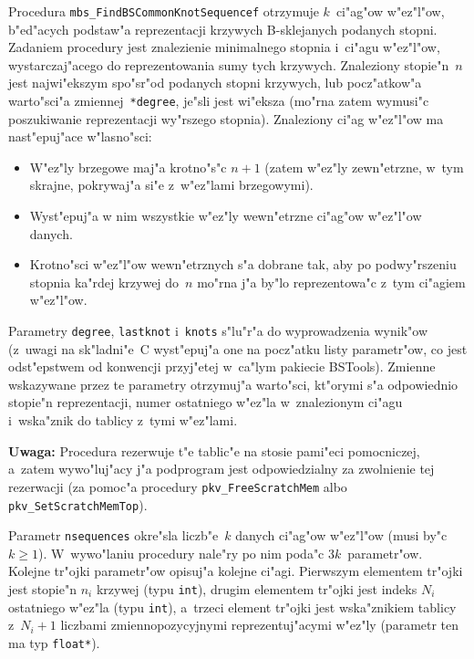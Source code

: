 \vspace{\bigskipamount}
Procedura \texttt{mbs\_FindBSCommonKnotSequencef} otrzymuje $k$~ci"ag"ow
w"ez"l"ow, b"ed"acych podstaw"a reprezentacji krzywych B-sklejanych
podanych stopni. Zadaniem procedury jest znalezienie minimalnego
stopnia i~ci"agu w"ez"l"ow, wystarczaj"acego do reprezentowania sumy
tych krzywych. Znaleziony stopie"n~$n$ jest najwi"ekszym spo"sr"od
podanych stopni krzywych, lub pocz"atkow"a warto"sci"a
zmiennej~\texttt{*degree}, je"sli jest wi"eksza (mo"rna zatem wymusi"c
poszukiwanie reprezentacji wy"rszego stopnia). Znaleziony ci"ag w"ez"l"ow
ma nast"epuj"ace w"lasno"sci:
\begin{itemize}
\item W"ez"ly brzegowe maj"a krotno"s"c $n+1$ (zatem w"ez"ly zewn"etrzne,
  w~tym skrajne, pokrywaj"a si"e z~w"ez"lami brzegowymi).
\item Wyst"epuj"a w nim wszystkie w"ez"ly wewn"etrzne ci"ag"ow w"ez"l"ow
  danych.
\item Krotno"sci w"ez"l"ow wewn"etrznych s"a dobrane tak, aby po
  podwy"rszeniu stopnia ka"rdej krzywej do~$n$ mo"rna j"a by"lo
  reprezentowa"c z~tym ci"agiem w"ez"l"ow.
\end{itemize}

Parametry \texttt{degree}, \texttt{lastknot} i~\texttt{knots} s"lu"r"a do
wyprowadzenia wynik"ow (z~uwagi na sk"ladni"e~C wyst"epuj"a one na pocz"atku
listy parametr"ow, co jest odst"epstwem od konwencji przyj"etej w~ca"lym
pakiecie BSTools). Zmienne wskazywane przez te parametry otrzymuj"a
warto"sci, kt"orymi s"a odpowiednio stopie"n reprezentacji, numer ostatniego
w"ez"la w~znalezionym ci"agu i~wska"znik do tablicy z~tymi w"ez"lami.

\vspace{\medskipamount}
\noindent
\textbf{Uwaga:} Procedura rezerwuje t"e tablic"e na stosie pami"eci
pomocniczej, a~zatem wywo"luj"acy j"a podprogram jest odpowiedzialny za
zwolnienie tej rezerwacji (za pomoc"a procedury \texttt{pkv\_FreeScratchMem}
albo \texttt{pkv\_SetScratchMemTop}).

\vspace{\medskipamount}
Parametr \texttt{nsequences} okre"sla liczb"e~$k$ danych ci"ag"ow w"ez"l"ow
(musi by"c $k\geq 1$). W~wywo"laniu procedury nale"ry po nim poda"c
$3k$~parametr"ow. Kolejne tr"ojki parametr"ow opisuj"a kolejne ci"agi.
Pierwszym elementem tr"ojki jest stopie"n $n_i$ krzywej (typu \texttt{int}),
drugim elementem tr"ojki jest indeks $N_i$ ostatniego w"ez"la (typu
\texttt{int}), a~trzeci element tr"ojki jest wska"znikiem tablicy
z~$N_i+1$ liczbami zmiennopozycyjnymi reprezentuj"acymi w"ez"ly (parametr
ten ma typ \texttt{float*}).

